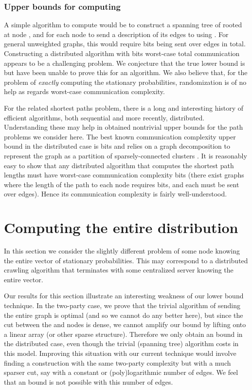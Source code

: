 \documentclass[twocolumn]{article}
\begin{document}
\subsubsection{Upper bounds for computing }

A simple algorithm to compute  would be to construct a spanning tree  of  rooted at node , and for each node to send a description of its edges to  using . For general unweighted graphs, this would require  bits being sent over  edges in total. Constructing a distributed algorithm with  bits worst-case total communication appears to be a challenging problem. We conjecture that the true lower bound is  but have been unable to prove this for an algorithm. We also believe that, for the problem of {\em exactly} computing the stationary probabilities, randomization is of no help as regards worst-case communication complexity.

For the related shortest paths problem, there is a long and interesting history of efficient algorithms, both sequential and more recently, distributed. Understanding these may help in obtained nontrivial upper bounds for the path problems we consider here. The best known communication complexity upper bound in the distributed case is  bits and relies on a graph decomposition to represent the graph as a partition of sparsely-connected clusters \cite{afek92sparser}. It is reasonably easy to show that any distributed algorithm that computes the shortest path lengths must have worst-case communication complexity  bits (there exist graphs where the length of the path to each node requires  bits, and each must be sent over  edges). Hence its communication complexity is fairly well-understood.

\section{Computing the entire distribution}
\label{section:distribution}

In this section we consider the slightly different problem of some node  knowing the entire vector  of stationary probabilities. This may correspond
to a distributed crawling algorithm that terminates with some centralized server  knowing the entire vector.

Our results for this section illustrate an interesting weakness of our
lower bound technique. In the two-party case, we prove that the trivial
algorithm of sending the entire graph is optimal (and so we cannot do
any better here), but since the cut between the  and  nodes is
dense, we cannot amplify our bound by lifting onto a linear array (or
other sparse structure). Therefore we only obtain an  bound
in the distributed case, even though the trivial (spanning tree)
algorithm costs  in this model. Improving this situation with
our current technique would involve finding a construction with the same
two-party complexity but with a much sparser cut, say with a constant or
(poly)logarithmic number of edges. We feel that an  bound is not
possible with this number of edges.
\end{document}
